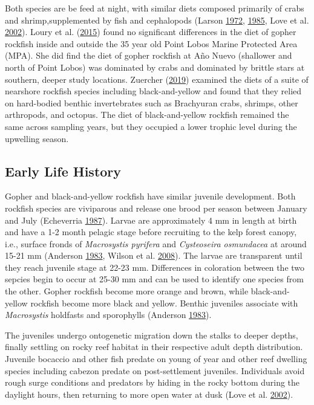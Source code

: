 \documentclass[12pt,]{article}
\begin{document}
Both species are be feed at night, with similar diets composed primarily
of crabs and shrimp,supplemented by fish and cephalopods (Larson
\protect\hyperlink{ref-Larson1972}{1972},
\protect\hyperlink{ref-Hallacher1985}{1985}, Love et al.
\protect\hyperlink{ref-Love2002}{2002}). Loury et al.
(\protect\hyperlink{ref-Loury2015}{2015}) found no significant
differences in the diet of gopher rockfish inside and outside the 35
year old Point Lobos Marine Protected Area (MPA). She did find the diet
of gopher rockfish at Año Nuevo (shallower and north of Point Lobos) was
dominated by crabs and dominated by brittle stars at southern, deeper
study locations. Zuercher (\protect\hyperlink{ref-Zuercher2019}{2019})
examined the diets of a suite of nearshore rockfish species including
black-and-yellow and found that they relied on hard-bodied benthic
invertebrates such as Brachyuran crabs, shrimps, other arthropods, and
octopus. The diet of black-and-yellow rockfish remained the same across
sampling years, but they occupied a lower trophic level during the
upwelling season.

\subsection{Early Life History}\label{early-life-history}

Gopher and black-and-yellow rockfish have similar juvenile development.
Both rockfish species are viviparous and release one brood per season
between January and July (Echeverria
\protect\hyperlink{ref-Echeverria1987}{1987}). Larvae are approximately
4 mm in length at birth and have a 1-2 month pelagic stage before
recruiting to the kelp forest canopy, i.e., surface fronds of
\emph{Macrosystis pyrifera} and \emph{Cysteoseira osmundacea} at around
15-21 mm (Anderson \protect\hyperlink{ref-Anderson1983}{1983}, Wilson et
al. \protect\hyperlink{ref-Wilson2008}{2008}). The larvae are
transparent until they reach juvenile stage at 22-23 mm. Differences in
coloration between the two sepcies begin to occur at 25-30 mm and can be
used to identify one species from the other. Gopher rockfish become more
orange and brown, while black-and-yellow rockfish become more black and
yellow. Benthic juveniles associate with \emph{Macrosystis} holdfasts
and sporophylls (Anderson \protect\hyperlink{ref-Anderson1983}{1983}).

The juveniles undergo ontogenetic migration down the stalks to deeper
depths, finally settling on rocky reef habitat in their respective adult
depth distribution. Juvenile bocaccio and other fish predate on young of
year and other reef dwelling species including cabezon predate on
post-settlement juveniles. Individuals avoid rough surge conditions and
predators by hiding in the rocky bottom during the daylight hours, then
returning to more open water at dusk (Love et al.
\protect\hyperlink{ref-Love2002}{2002}).
\end{document}
